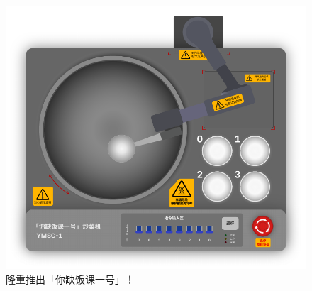 \begin{figure}[htb!]
  \centering
  \includegraphics[width=.65\textwidth]{assets/surpass/YMSC-1.pdf}
  \caption{隆重推出「你缺饭课一号」！}
  \label{fig:YMSC-1}
\end{figure}

